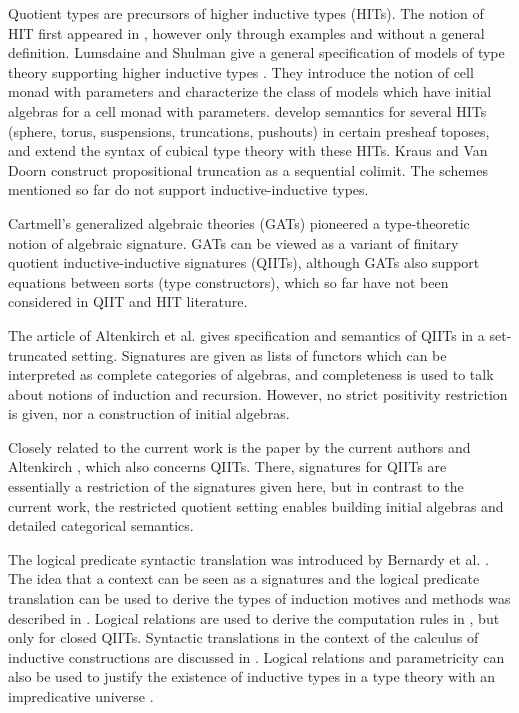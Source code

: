 \documentclass[dvipsnames]{lmcs} %
\newcommand{\1}{\mathsf{1}} \renewcommand{\Pr}{\mathsf{Pr}}
\theoremstyle{plain}\newtheorem{satz}[thm]{Satz} %
\begin{document}
Quotient types \cite{hofmann95extensional} are precursors of higher inductive
types (HITs). The notion of HIT first appeared in \cite{HoTTbook}, however only
through examples and without a general definition.  Lumsdaine and Shulman give a
general specification of models of type theory supporting higher inductive types
\cite{lumsdaineShulman}. They introduce the notion of cell monad with parameters
and characterize the class of models which have initial algebras for a cell
monad with parameters. \cite{cubicalhits} develop semantics for several HITs
(sphere, torus, suspensions, truncations, pushouts) in certain presheaf toposes,
and extend the syntax of cubical type theory \cite{ctt} with these HITs. Kraus
\cite{krausprop} and Van Doorn \cite{doorn} construct propositional truncation
as a sequential colimit. The schemes mentioned so far do not support
inductive-inductive types.

Cartmell's generalized algebraic theories (GATs) \cite{gat} pioneered a
type-theoretic notion of algebraic signature. GATs can be viewed as a variant of
finitary quotient inductive-inductive signatures (QIITs), although GATs also
support equations between sorts (type constructors), which so far have not been
considered in QIIT and HIT literature.

The article of Altenkirch et al. \cite{gabe} gives specification and semantics
of QIITs in a set-truncated setting. Signatures are given as lists of functors
which can be interpreted as complete categories of algebras, and completeness is
used to talk about notions of induction and recursion.  However, no strict
positivity restriction is given, nor a construction of initial algebras.

Closely related to the current work is the paper by the current authors and
Altenkirch \cite{kaposi2019constructing}, which also concerns QIITs. There,
signatures for QIITs are essentially a restriction of the signatures given here,
but in contrast to the current work, the restricted quotient setting enables
building initial algebras and detailed categorical semantics.

The logical predicate syntactic translation was introduced by Bernardy et
al. \cite{bernardy2010parametricity}. The idea that a context can be seen as a
signatures and the logical predicate translation can be used to derive the types
of induction motives and methods was described in \cite[Section
  5.3]{ttintt}. Logical relations are used to derive the computation rules in
\cite[Section 4.3]{kaposi-phd}, but only for closed QIITs. Syntactic
translations in the context of the calculus of inductive constructions are
discussed in \cite{next700}. Logical relations and parametricity can also be
used to justify the existence of inductive types in a type theory with an
impredicative universe \cite{atkey}.
\end{document}
